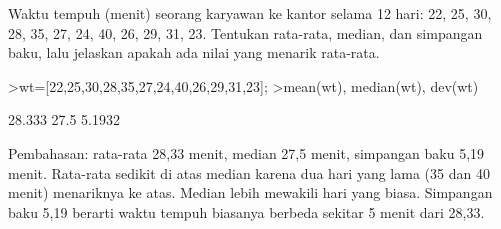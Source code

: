 \documentclass[a4paper,10pt]{article}
\begin{document}
\begin{eulernotebook}
\begin{eulercomment}
\begin{eulercomment}
\begin{eulercomment}
\begin{eulercomment}
\begin{eulercomment}
\begin{eulercomment}
\begin{eulercomment}
\begin{eulercomment}
\begin{eulercomment}
\begin{eulercomment}
\begin{eulercomment}
\begin{eulercomment}
\begin{eulercomment}
\begin{eulercomment}
\begin{eulercomment}
\begin{eulercomment}
\begin{eulercomment}
\begin{eulercomment}
\begin{eulercomment}
\begin{eulercomment}
\begin{eulercomment}
\begin{eulercomment}
\begin{eulercomment}
\begin{eulercomment}
\begin{eulercomment}
\begin{eulercomment}
\begin{eulercomment}
\begin{eulercomment}
\begin{eulercomment}
\begin{eulercomment}
\begin{eulercomment}
\end{eulercomment}
\begin{eulercomment}
Waktu tempuh (menit) seorang karyawan ke kantor selama 12 hari: 22, 25, 30, 28, 35, 27, 24,
40, 26, 29, 31, 23. Tentukan rata-rata, median, dan simpangan baku, lalu jelaskan apakah ada
nilai yang menarik rata-rata.
\end{eulercomment}
\begin{eulerprompt}
>wt=[22,25,30,28,35,27,24,40,26,29,31,23];
>mean(wt), median(wt), dev(wt)
\end{eulerprompt}
\begin{euleroutput}
  28.333
  27.5
  5.1932
\end{euleroutput}
\begin{eulercomment}
Pembahasan: rata-rata 28,33 menit, median 27,5 menit, simpangan baku 5,19 menit. Rata-rata
sedikit di atas median karena dua hari yang lama (35 dan 40 menit) menariknya ke atas. Median
lebih mewakili hari yang biasa. Simpangan baku 5,19 berarti waktu tempuh biasanya berbeda
sekitar 5 menit dari 28,33.


\end{eulercomment}
\end{eulercomment}
\end{eulercomment}
\end{eulercomment}
\end{eulercomment}
\end{eulercomment}
\end{eulercomment}
\end{eulercomment}
\end{eulercomment}
\end{eulercomment}
\end{eulercomment}
\end{eulercomment}
\end{eulercomment}
\end{eulercomment}
\end{eulercomment}
\end{eulercomment}
\end{eulercomment}
\end{eulercomment}
\end{eulercomment}
\end{eulercomment}
\end{eulercomment}
\end{eulercomment}
\end{eulercomment}
\end{eulercomment}
\end{eulercomment}
\end{eulercomment}
\end{eulercomment}
\end{eulercomment}
\end{eulercomment}
\end{eulercomment}
\end{eulercomment}
\end{eulernotebook}
\end{document}
